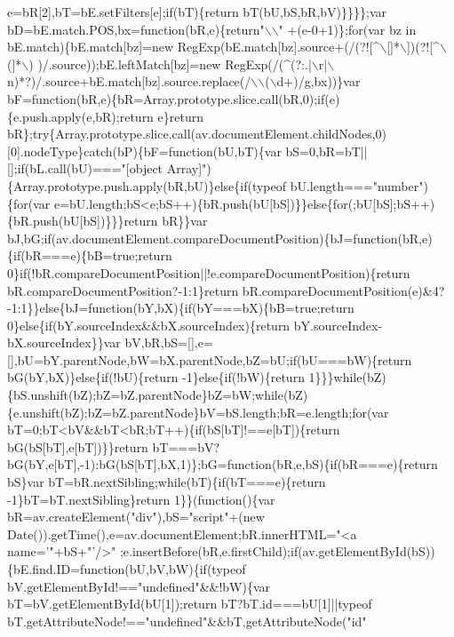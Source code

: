 \begin{DoxyCode}
{{       e=bR[2],bT=bE.setFilters[e];if(bT)\{return bT(bU,bS,bR,bV)\}\}\}\};var bD=bE.match.POS,bx=function(bR,e)\{return"}\(\backslash\)\(\backslash\)\textcolor{stringliteral}{"
      +(e-0+1)\};for(var bz in bE.match)\{bE.match[bz]=new RegExp(bE.match[bz].source+(/(?![^\(\backslash\)[]*\(\backslash\)])(?![^\(\backslash\)(]*\(\backslash\))
      )/.source));bE.leftMatch[bz]=new RegExp(/(^(?:.|\(\backslash\)r|\(\backslash\)n)*?)/.source+bE.match[bz].source.replace(/\(\backslash\)\(\backslash\)(\(\backslash\)d+)/g,bx))\}var
       bF=function(bR,e)\{bR=Array.prototype.slice.call(bR,0);if(e)\{e.push.apply(e,bR);return e\}return
       bR\};try\{Array.prototype.slice.call(av.documentElement.childNodes,0)[0].nodeType\}catch(bP)\{bF=function(bU,bT)\{var
       bS=0,bR=bT||[];if(bL.call(bU)==="}[\textcolor{keywordtype}{object} Array]\textcolor{stringliteral}{")\{Array.prototype.push.apply(bR,bU)\}else\{if(typeof bU.length==="}number\textcolor{stringliteral}{")\{for(var
       e=bU.length;bS<e;bS++)\{bR.push(bU[bS])\}\}else\{for(;bU[bS];bS++)\{bR.push(bU[bS])\}\}\}return bR\}\}var
       bJ,bG;if(av.documentElement.compareDocumentPosition)\{bJ=function(bR,e)\{if(bR===e)\{bB=true;return
       0\}if(!bR.compareDocumentPosition||!e.compareDocumentPosition)\{return bR.compareDocumentPosition?-1:1\}return
       bR.compareDocumentPosition(e)&4?-1:1\}\}else\{bJ=function(bY,bX)\{if(bY===bX)\{bB=true;return
       0\}else\{if(bY.sourceIndex&&bX.sourceIndex)\{return bY.sourceIndex-bX.sourceIndex\}\}var
       bV,bR,bS=[],e=[],bU=bY.parentNode,bW=bX.parentNode,bZ=bU;if(bU===bW)\{return bG(bY,bX)\}else\{if(!bU)\{return -1\}else\{if(!bW)\{return
       1\}\}\}while(bZ)\{bS.unshift(bZ);bZ=bZ.parentNode\}bZ=bW;while(bZ)\{e.unshift(bZ);bZ=bZ.parentNode\}bV=bS.length;bR=e.length;for(var
       bT=0;bT<bV&&bT<bR;bT++)\{if(bS[bT]!==e[bT])\{return bG(bS[bT],e[bT])\}\}return
       bT===bV?bG(bY,e[bT],-1):bG(bS[bT],bX,1)\};bG=function(bR,e,bS)\{if(bR===e)\{return bS\}var bT=bR.nextSibling;while(bT)\{if(bT===e)\{return -1\}bT=bT.nextSibling\}return
       1\}\}(function()\{var bR=av.createElement("}div\textcolor{stringliteral}{"),bS="}script\textcolor{stringliteral}{"+(new
       Date()).getTime(),e=av.documentElement;bR.innerHTML="}<a name=\textcolor{stringliteral}{'"+bS+"'}/>\textcolor{stringliteral}{"
      ;e.insertBefore(bR,e.firstChild);if(av.getElementById(bS))\{bE.find.ID=function(bU,bV,bW)\{if(typeof bV.getElementById!=="}undefined\textcolor{stringliteral}{"&&!bW)\{var bT=bV.getElementById(bU[1]);return
       bT?bT.id===bU[1]||typeof bT.getAttributeNode!=="}undefined\textcolor{stringliteral}{"&&bT.getAttributeNode("}\textcolor{keywordtype}{id}\textcolor{stringliteral}{"
}}
\end{DoxyCode}
